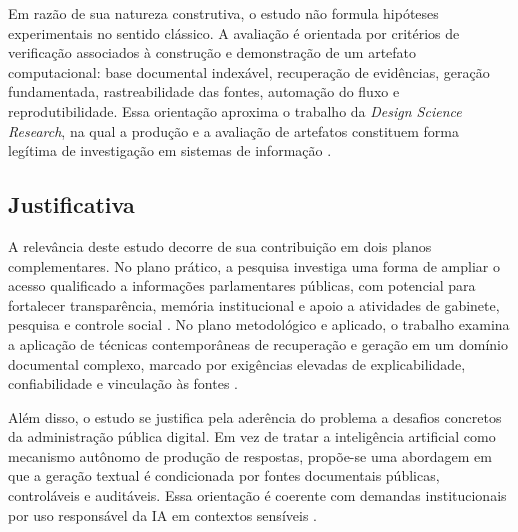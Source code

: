 Em razão de sua natureza construtiva, o estudo não formula hipóteses experimentais no sentido clássico. A avaliação é orientada por critérios de verificação associados à construção e demonstração de um artefato computacional: base documental indexável, recuperação de evidências, geração fundamentada, rastreabilidade das fontes, automação do fluxo e reprodutibilidade. Essa orientação aproxima o trabalho da \textit{Design Science Research}, na qual a produção e a avaliação de artefatos constituem forma legítima de investigação em sistemas de informação \parencite{hevnerEtAl2004designScience,peffersEtAl2007dsrm}.

\subsection{Justificativa}

A relevância deste estudo decorre de sua contribuição em dois planos complementares. No plano prático, a pesquisa investiga uma forma de ampliar o acesso qualificado a informações parlamentares públicas, com potencial para fortalecer transparência, memória institucional e apoio a atividades de gabinete, pesquisa e controle social \parencite{ipu2024aiParliaments,geunis2023parliamentaryMonitoring}. No plano metodológico e aplicado, o trabalho examina a aplicação de técnicas contemporâneas de recuperação e geração em um domínio documental complexo, marcado por exigências elevadas de explicabilidade, confiabilidade e vinculação às fontes \parencite{martelloteViola2025organizacaoConhecimento,wfd2023guidelinesAiParliaments}.

Além disso, o estudo se justifica pela aderência do problema a desafios concretos da administração pública digital. Em vez de tratar a inteligência artificial como mecanismo autônomo de produção de respostas, propõe-se uma abordagem em que a geração textual é condicionada por fontes documentais públicas, controláveis e auditáveis. Essa orientação é coerente com demandas institucionais por uso responsável da IA em contextos sensíveis \parencite{deAlmeidaSantos2025aiGovernance,wfd2023guidelinesAiParliaments}.
